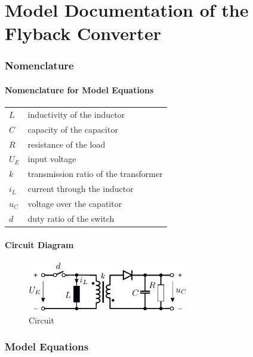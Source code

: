 \documentclass[10pt,a4paper]{article}
\begin{document}
	\part*{Model Documentation of the \\ Flyback Converter} %
	
	
	\section{Nomenclature} %
	\subsection{Nomenclature for Model Equations} %
	
	\begin{tabular}{ll}
		$L$ & inductivity of the inductor \\
		$C$ & capacity of the capacitor \\
		$R$ & resistance of the load \\
		$U_E$ & input voltage \\
		$k$ & transmission ratio of the transformer \\
		$i_L$ & current through the inductor \\
		$u_C$ & voltage over the capatitor \\
		$d$ & duty ratio of the switch \\
			
	\end{tabular}
	 
	\subsection{Circuit Diagram}
	\begin{figure}[H]
		\centering
		\includegraphics[width=70mm]{Flyback_converter_circuit.pdf}
		\caption{Circuit}
	\end{figure}
	
	
	\section{Model Equations} %
	
\end{document}
